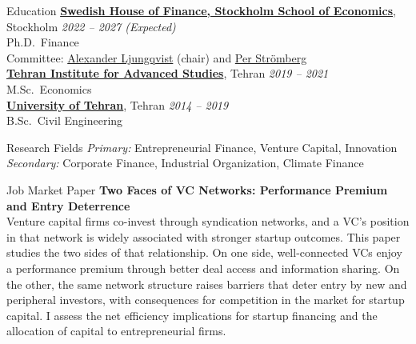 \documentclass{resume}
\begin{document}
\begin{rSection}{Education}
  \vspace{-2pt}
  {\bf \href{https://www.hhs.se/en/houseoffinance/}{Swedish House of Finance, Stockholm School of Economics}}, Stockholm \hfill {\em 2022 -- 2027 (Expected)} \\
  Ph.D.\ Finance \\[-2pt]
  {\small Committee: \href{https://www.hhs.se/en/houseoffinance/about/people/people-container/alexander-ljungqvist/}{Alexander Ljungqvist} (chair) and \href{https://www.hhs.se/en/houseoffinance/about/people/people-container/per-stromberg/}{Per Str\"{o}mberg}} \\[2pt]
  {\bf \href{https://teias.institute/}{Tehran Institute for Advanced Studies}}, Tehran \hfill {\em 2019 -- 2021} \\
  M.Sc.\ Economics \\[2pt]
  {\bf \href{https://www.ut.ac.ir/en}{University of Tehran}}, Tehran \hfill {\em 2014 -- 2019} \\
  B.Sc.\ Civil Engineering
\end{rSection}

\begin{rSection}{Research Fields}
  \vspace{-2pt}
  {\em Primary:} Entrepreneurial Finance, Venture Capital, Innovation \\
  {\em Secondary:} Corporate Finance, Industrial Organization, Climate Finance
\end{rSection}

\begin{rSection}{Job Market Paper}
  \vspace{2pt}
  {\bf Two Faces of VC Networks: Performance Premium and Entry Deterrence} \\[2pt]
  {\small Venture capital firms co-invest through syndication networks, and a VC's position in that network is widely associated with stronger startup outcomes. This paper studies the two sides of that relationship. On one side, well-connected VCs enjoy a performance premium through better deal access and information sharing. On the other, the same network structure raises barriers that deter entry by new and peripheral investors, with consequences for competition in the market for startup capital. I assess the net efficiency implications for startup financing and the allocation of capital to entrepreneurial firms.}
\end{rSection}
\end{document}
